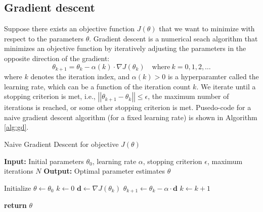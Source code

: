 \documentclass{article}[11pt]
\newcommand{\norm}[1]{\left|\left|#1\right|\right|}
\begin{document}
\subsection{Gradient descent}
Suppose there exists an objective function $J(\theta)$ that we want to minimize with respect to the parameters $\theta$. 
Gradient descent is a numerical seach algorithm that minimizes an objective function by iteratively adjusting the parameters in the opposite direction of the gradient:
\begin{equation*}
    \theta_{k+1} = \theta_{k} - \alpha(k)\cdot\nabla{J}(\theta_{k})\quad\text{where}{~k = 0,1,2,\dots}
\end{equation*}
where $k$ denotes the iteration index, and $\alpha(k)>0$ is a hyperparamter called the learning rate, which can be a function of the iteration count $k$.
We iterate until a stopping criterion is met, i.e., $\norm{\theta_{k+1} - \theta_{k}}\leq\epsilon$, the maximum number of iterations is reached, or some other stopping criterion is met.
Pusedo-code for a naive gradient descent algorithm (for a fixed learning rate) is shown in Algorithm \ref{alg:gd}.
\begin{algorithm}[H]
\caption{Naive Gradient Descent for objective ${J}(\theta)$}\label{alg:gd}
\begin{algorithmic}[1]
\State \textbf{Input:} Initial parameters $\theta_0$, learning rate $\alpha$, stopping criterion $\epsilon$, maximum iterations $N$
\State \textbf{Output:} Optimal parameter estimates $\theta$

\State Initialize $\theta \gets \theta_0$
\State $k \gets 0$
    \State $\mathbf{d} \gets \nabla J(\theta_{k})$
    \State $\theta_{k+1} \gets \theta_{k} - \alpha \cdot \mathbf{d}$
    \State $k \gets k + 1$
\EndWhile

\State \textbf{return} $\theta$
\end{algorithmic}
\end{algorithm}
\end{document}
